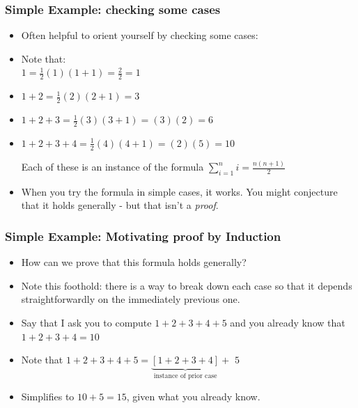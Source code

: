  \begin{frame}
\frametitle{Simple Example: checking some cases}

\begin{itemize}[<+->]
\item Often helpful to orient yourself by checking some cases:

\item Note that:\\
$1 =  \frac{1}{2} (1) (1+1) = \frac{2}{2} =1$

\item $1+2 =  \frac{1}{2} (2)(2+1) = 3$

\item $1+2+3 =  \frac{1}{2} (3)(3+1) =  (3)(2) = 6$

\item $1+2+3 + 4 =  \frac{1}{2} (4)(4+1) =  (2)(5) = 10$


Each of these is an instance of the formula  $\displaystyle\sum_{i=1}^n i =\frac{n(n+1)}{2}$\\[2ex]

\item When you try the formula in simple cases, it works. You might conjecture that it holds generally - but that isn't a {\it{proof}}.
\end{itemize} 
\end{frame}

 \begin{frame}
\frametitle{Simple Example: Motivating proof by Induction}

\begin{itemize}[<+->]
\item How can we prove that this formula holds generally?

\item Note this foothold: there is a way to break down each case so that it depends straightforwardly on the immediately previous one. 

\item Say that I ask you to compute $1+2+3 + 4 + 5$ and you already know that $1+2+3 + 4  = 10$

\item Note that $1+2+3 + 4 + 5 = \underbrace{[1+2+3 + 4]}_{\text{instance of prior case}} + \,\, 5 $\\[3ex]

\item Simplifies to $10 + 5 = 15$, given what you already know. 

\end{itemize} 
\end{frame}

